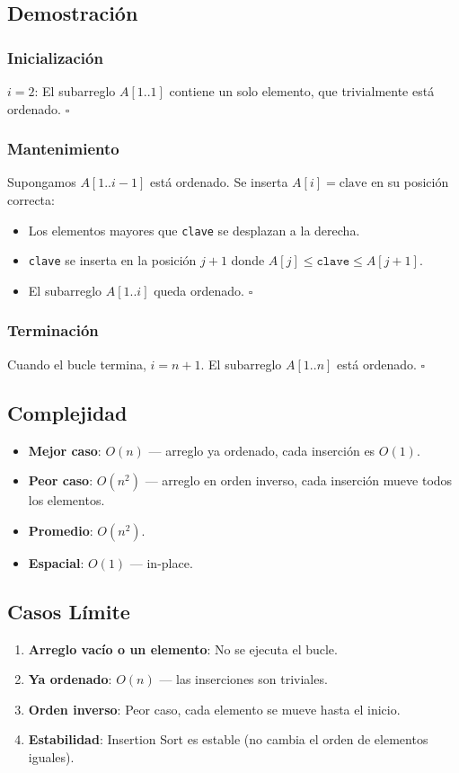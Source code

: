 \documentclass[11pt,a4paper]{article}
\begin{document}
\subsection{Demostración}

\subsubsection{Inicialización}
$i = 2$: El subarreglo $A[1..1]$ contiene un solo elemento, que trivialmente está ordenado. $\square$

\subsubsection{Mantenimiento}
Supongamos $A[1..i-1]$ está ordenado. Se inserta $A[i] = \text{clave}$ en su posición correcta:
\begin{itemize}
    \item Los elementos mayores que \texttt{clave} se desplazan a la derecha.
    \item \texttt{clave} se inserta en la posición $j+1$ donde $A[j] \leq \texttt{clave} \leq A[j+1]$.
    \item El subarreglo $A[1..i]$ queda ordenado. $\square$
\end{itemize}

\subsubsection{Terminación}
Cuando el bucle termina, $i = n+1$. El subarreglo $A[1..n]$ está ordenado. $\square$

\subsection{Complejidad}
\begin{itemize}
    \item \textbf{Mejor caso}: $O(n)$ --- arreglo ya ordenado, cada inserción es $O(1)$.
    \item \textbf{Peor caso}: $O(n^2)$ --- arreglo en orden inverso, cada inserción mueve todos los elementos.
    \item \textbf{Promedio}: $O(n^2)$.
    \item \textbf{Espacial}: $O(1)$ --- in-place.
\end{itemize}

\subsection{Casos Límite}
\begin{enumerate}
    \item \textbf{Arreglo vacío o un elemento}: No se ejecuta el bucle.
    \item \textbf{Ya ordenado}: $O(n)$ --- las inserciones son triviales.
    \item \textbf{Orden inverso}: Peor caso, cada elemento se mueve hasta el inicio.
    \item \textbf{Estabilidad}: Insertion Sort es estable (no cambia el orden de elementos iguales).
\end{enumerate}
\end{document}
